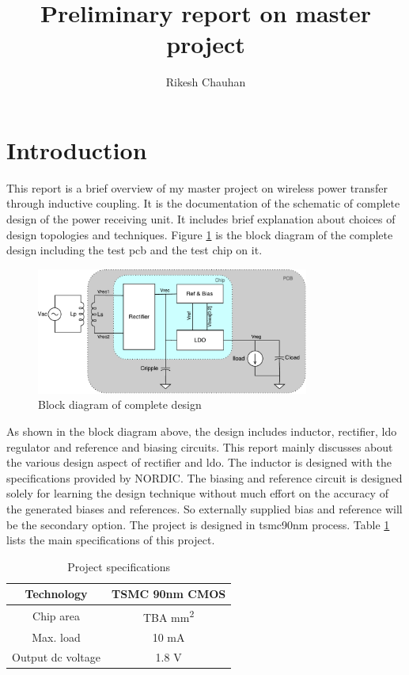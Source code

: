 \documentclass[12pt,a4paper,UKenglish]{article}
\title{Preliminary report on master project}
\author{Rikesh Chauhan}
\date{}
\begin{document}
\maketitle

\section{Introduction}
This report is a brief overview of my master project on wireless power transfer through inductive coupling. It is the documentation of the schematic of complete design of the power receiving unit. It includes brief explanation about choices of design topologies and techniques. Figure \ref{fig:blockd} is the block diagram of the complete design including the test \acrshort{pcb} and the test chip on it.

\begin{figure}[htbp] %
   \centering
   \includegraphics[width=0.8\textwidth]{img/block_diagram.pdf} 
   \caption{Block diagram of complete design}
   \label{fig:blockd}
\end{figure}

As shown in the block diagram above, the design includes inductor, rectifier, \acrshort{ldo} regulator and reference and biasing circuits. This report mainly discusses about the various design aspect of rectifier and \acrshort{ldo}. The inductor is designed with the specifications provided by NORDIC. The biasing and reference circuit is designed solely for learning the design technique without much effort on the accuracy of the generated biases and references. So externally supplied bias and reference will be the secondary option. The project is designed in tsmc90nm process. Table \ref{proj_spec} lists the main specifications of this project.  \\ 

\begin{table}[!htbp]
\caption{Project specifications}
\begin{center}
\begin{tabular}{c|c}
\hline \hline
Technology & TSMC 90nm CMOS \\ \hline
Chip area & TBA mm\textsuperscript{2} \\ \hline
Max. load & 10 mA \\ \hline
Output dc voltage & 1.8 V \\ 
\hline \hline
\end{tabular}
\end{center}
\label{proj_spec}
\end{table}
\end{document}
